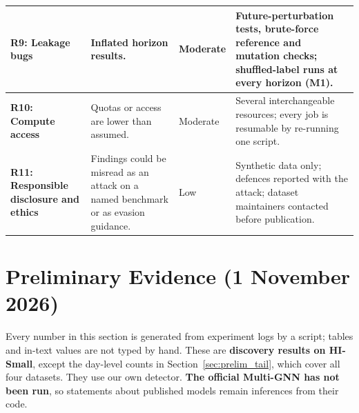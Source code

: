 \documentclass[11pt,a4paper]{article}
\begin{document}
\begin{table}[htbp]
\begin{tabularx}{\textwidth}{L{2.7cm} L{3.4cm} L{1.2cm} X}
\midrule
\textbf{R9: Leakage bugs} & Inflated horizon results. & Moderate & Future-perturbation tests, brute-force reference and mutation checks; shuffled-label runs at every horizon (M1). \\
\midrule
\textbf{R10: Compute access} & Quotas or access are lower than assumed. & Moderate & Several interchangeable resources; every job is resumable by re-running one script. \\
\midrule
\textbf{R11: Responsible disclosure and ethics} & Findings could be misread as an attack on a named benchmark or as evasion guidance. & Low & Synthetic data only; defences reported with the attack; dataset maintainers contacted before publication. \\
\bottomrule
\end{tabularx}
\end{table}

\section{Preliminary Evidence (1 November 2026)}
\label{sec:preliminary}
Every number in this section is generated from experiment logs by a script; tables and in-text values are not typed by hand. These are \textbf{discovery results on HI-Small}, except the day-level counts in Section~\ref{sec:prelim_tail}, which cover all four datasets. They use our own detector. \textbf{The official Multi-GNN has not been run}, so statements about published models remain inferences from their code.
\end{document}
